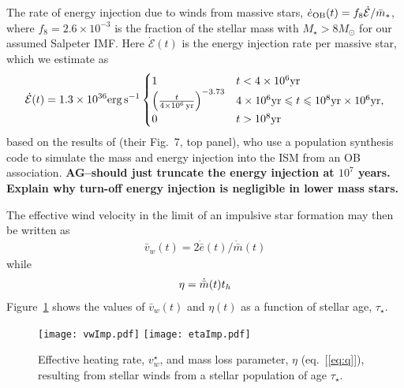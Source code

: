 The rate of energy injection due to winds from massive
stars, $\dot{e}_{\rm OB}(t) = f_{8}\dot{\mathcal{E}}/\bar{m}_*$, where
$f_{8} =2.6 \times 10^{-3}$ is the fraction of the stellar mass with
$M_{\star} > 8M_{\odot}$ for our assumed Salpeter IMF.  Here
$\dot{\mathcal{E}} (t)$ is the energy injection rate per massive star,
which we estimate as
\begin{align}
\dot{\mathcal{E}} (t)=  1.3 \times 10^{36} {\rm erg\,s^{-1}}
\begin{cases}
  1 & t<4 \times 10^6 {\rm yr}\\
  \left(\frac{t}{4 \times  10^6\,{\rm yr}}\right)^{-3.73} &  4\times
  10^{6} {\rm yr}  \le t \le 10^{8} {\rm yr}
  \times 10^6 {\rm yr},\\
  0 & t > 10^8 {\rm yr}
\end{cases}
\label{eq:voss}
\end{align}
based on the results of \citet{VossDiehl+:2009a} (their Fig.~7, top
panel), who use a population synthesis code to simulate the mass and
energy injection into the ISM from an OB association. {\bf AG--should
  just truncate the energy injection at $10^7$ years. Explain why
  turn-off energy injection is negligible in lower mass stars.}


The effective wind velocity in the limit of an impulsive star
formation may then be written as
\begin{align}
\bar{v}_w(t)=2 \dot{\bar{e}}(t)/\dot{\bar{m}}(t)
\label{eq:vwImp}
\end{align}
while 
\begin{align}
\eta = \dot{\bar{m}}(t) \th
\label{eq:etaImp}
\end{align}
 Figure~\ref{fig:vwImp} shows the values of $\bar{v}_w(t)$ and $\eta(t)$ as a function of stellar age, $\tau_{\star}$.

\begin{figure}
\texttt{[image: vwImp.pdf]}
\texttt{[image: etaImp.pdf]}
\caption{\label{fig:vwImp} Effective heating rate, $v_w^{\star}$, and mass loss parameter, $\eta$ (eq.~[\ref{eq:q}]), resulting from stellar winds from a stellar population of age $\tau_{\star}$.}
\end{figure}



